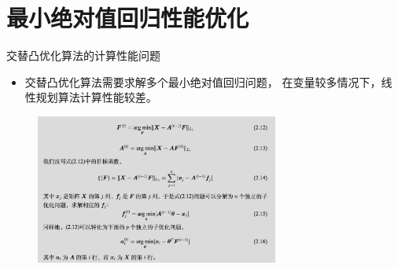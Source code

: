 \section{最小绝对值回归性能优化}

\begin{frame}{交替凸优化算法的计算性能问题}
    \begin{itemize}
        \item
        交替凸优化算法需要求解多个最小绝对值回归问题，
        在变量较多情况下，线性规划算法计算性能较差。
    \end{itemize}
\begin{figure}[H]
\includegraphics[width=8cm]{pics/acp-problem.png}
\end{figure}
\end{frame}

